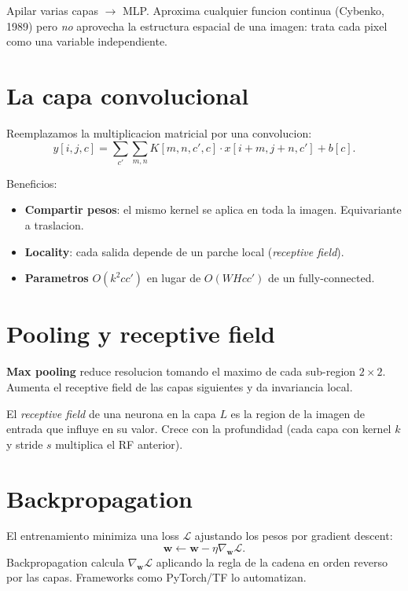 \documentclass[11pt,a4paper,twoside,openright]{book}
\begin{document}
Apilar varias capas $\to$ MLP. Aproxima cualquier funcion continua (Cybenko, 1989) pero \emph{no} aprovecha la estructura espacial de una imagen: trata cada pixel como una variable independiente.

\section{La capa convolucional}

Reemplazamos la multiplicacion matricial por una convolucion:
\begin{equation}
y[i,j,c] = \sum_{c'} \sum_{m,n} K[m,n,c',c] \cdot x[i+m, j+n, c'] + b[c].
\end{equation}

Beneficios:
\begin{itemize}[leftmargin=2em]
  \item \textbf{Compartir pesos}: el mismo kernel se aplica en toda la imagen. Equivariante a traslacion.
  \item \textbf{Locality}: cada salida depende de un parche local (\emph{receptive field}).
  \item \textbf{Parametros} $O(k^2 c c')$ en lugar de $O(WH c c')$ de un fully-connected.
\end{itemize}

\section{Pooling y receptive field}

\textbf{Max pooling} reduce resolucion tomando el maximo de cada sub-region $2{\times}2$. Aumenta el receptive field de las capas siguientes y da invariancia local.

El \emph{receptive field} de una neurona en la capa $L$ es la region de la imagen de entrada que influye en su valor. Crece con la profundidad (cada capa con kernel $k$ y stride $s$ multiplica el RF anterior).

\section{Backpropagation}

El entrenamiento minimiza una loss $\mathcal{L}$ ajustando los pesos por gradient descent:
\begin{equation}
\mathbf{w} \leftarrow \mathbf{w} - \eta \nabla_\mathbf{w} \mathcal{L}.
\end{equation}
Backpropagation calcula $\nabla_\mathbf{w} \mathcal{L}$ aplicando la regla de la cadena en orden reverso por las capas. Frameworks como PyTorch/TF lo automatizan.
\end{document}
